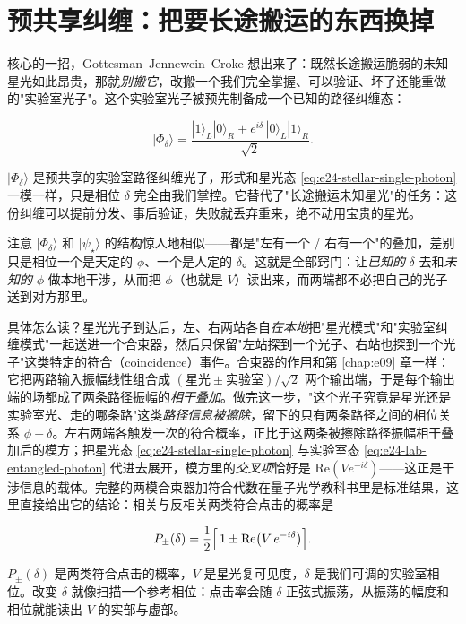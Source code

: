 \section{预共享纠缠：把要长途搬运的东西换掉}
\label{sec:e24-gjc}

核心的一招，Gottesman--Jennewein--Croke 想出来了：既然长途搬运脆弱的未知星光如此昂贵，那就\emph{别搬它}，改搬一个我们完全掌握、可以验证、坏了还能重做的"实验室光子"。这个实验室光子被预先制备成一个已知的路径纠缠态：

\begin{equation}
  |\Phi_\delta\rangle
  =
  \frac{|1\rangle_L|0\rangle_R
  +
  e^{i\delta}\,|0\rangle_L|1\rangle_R}{\sqrt2}.
  \label{eq:e24-lab-entangled-photon}
\end{equation}
\begin{formulaexplain}
\(|\Phi_\delta\rangle\) 是预共享的实验室路径纠缠光子，形式和星光态 \eqref{eq:e24-stellar-single-photon} 一模一样，只是相位 \(\delta\) 完全由我们掌控。它替代了"长途搬运未知星光"的任务：这份纠缠可以提前分发、事后验证，失败就丢弃重来，绝不动用宝贵的星光。
\end{formulaexplain}

注意 \(|\Phi_\delta\rangle\) 和 \(|\psi_\star\rangle\) 的结构惊人地相似——都是"左有一个 / 右有一个"的叠加，差别只是相位一个是天定的 \(\phi\)、一个是人定的 \(\delta\)。这就是全部窍门：让\emph{已知的} \(\delta\) 去和\emph{未知的} \(\phi\) 做本地干涉，从而把 \(\phi\)（也就是 \(V\)）读出来，而两端都不必把自己的光子送到对方那里。

具体怎么读？星光光子到达后，左、右两站各自\emph{在本地}把"星光模式"和"实验室纠缠模式"一起送进一个合束器，然后只保留"左站探到一个光子、右站也探到一个光子"这类特定的符合（coincidence）事件。合束器的作用和第 \ref{chap:e09} 章一样：它把两路输入振幅线性组合成 \((\text{星光}\pm\text{实验室})/\sqrt2\) 两个输出端，于是每个输出端的场都成了两条路径振幅的\emph{相干叠加}。做完这一步，"这个光子究竟是星光还是实验室光、走的哪条路"这类\emph{路径信息被擦除}，留下的只有两条路径之间的相位关系 \(\phi-\delta\)。左右两端各触发一次的符合概率，正比于这两条被擦除路径振幅相干叠加后的模方；把星光态 \eqref{eq:e24-stellar-single-photon} 与实验室态 \eqref{eq:e24-lab-entangled-photon} 代进去展开，模方里的\emph{交叉项}恰好是 \(\mathrm{Re}(V e^{-i\delta})\)——这正是干涉信息的载体。完整的两模合束器加符合代数在量子光学教科书里是标准结果，这里直接给出它的结论：相关与反相关两类符合点击的概率是

\begin{equation}
  P_{\pm}(\delta)
  =
  \frac{1}{2}
  \Bigl[\,1\pm\mathrm{Re}\!\left(V\,e^{-i\delta}\right)\Bigr].
  \label{eq:e24-gjc-probability}
\end{equation}
\begin{formulaexplain}
\(P_\pm(\delta)\) 是两类符合点击的概率，\(V\) 是星光复可见度，\(\delta\) 是我们可调的实验室相位。改变 \(\delta\) 就像扫描一个参考相位：点击率会随 \(\delta\) 正弦式振荡，从振荡的幅度和相位就能读出 \(V\) 的实部与虚部。
\end{formulaexplain}

